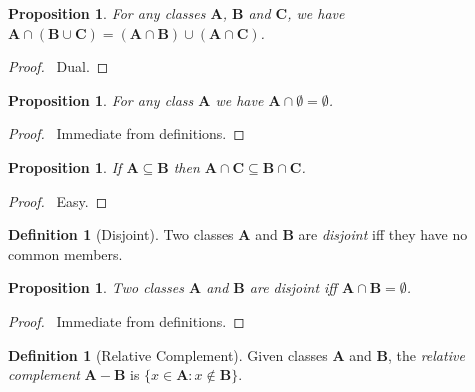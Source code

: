 \documentclass{article}
\let\qed\relax
\newtheorem{proposition}[axiom]{Proposition}
\theoremstyle{definition}
\newtheorem{definition}[axiom]{Definition}
\begin{document}
    \begin{proposition}
        For any classes $\mathbf{A}$, $\mathbf{B}$ and $\mathbf{C}$, we have
        $\mathbf{A} \cap (\mathbf{B} \cup \mathbf{C}) = (\mathbf{A} \cap \mathbf{B}) \cup
        (\mathbf{A} \cap \mathbf{C})$.
    \end{proposition}

    \begin{proof}
        \pf\ Dual. \qed
    \end{proof}

    \begin{proposition}
        For any class $\mathbf{A}$ we have $\mathbf{A} \cap \emptyset = \emptyset$.
    \end{proposition}

    \begin{proof}
        \pf\ Immediate from definitions. \qed
    \end{proof}

    \begin{proposition}
        If $\mathbf{A} \subseteq \mathbf{B}$ then $\mathbf{A} \cap \mathbf{C} \subseteq \mathbf{B}
        \cap \mathbf{C}$.
    \end{proposition}

    \begin{proof}
        \pf\ Easy. \qed
    \end{proof}

    \begin{definition}[Disjoint]
        Two classes $\mathbf{A}$ and $\mathbf{B}$ are \emph{disjoint} iff they have no common members.
    \end{definition}

    \begin{proposition}
        Two classes $\mathbf{A}$ and $\mathbf{B}$ are \emph{disjoint} iff $\mathbf{A} \cap \mathbf{B}
        = \emptyset$.
    \end{proposition}

    \begin{proof}
        \pf\ Immediate from definitions. \qed
    \end{proof}

    \begin{definition}[Relative Complement]
        Given classes $\mathbf{A}$ and $\mathbf{B}$, the \emph{relative complement}
        $\mathbf{A} - \mathbf{B}$ is $\{ x \in \mathbf{A} : x \notin \mathbf{B} \}$.
    \end{definition}
    
\end{document}
